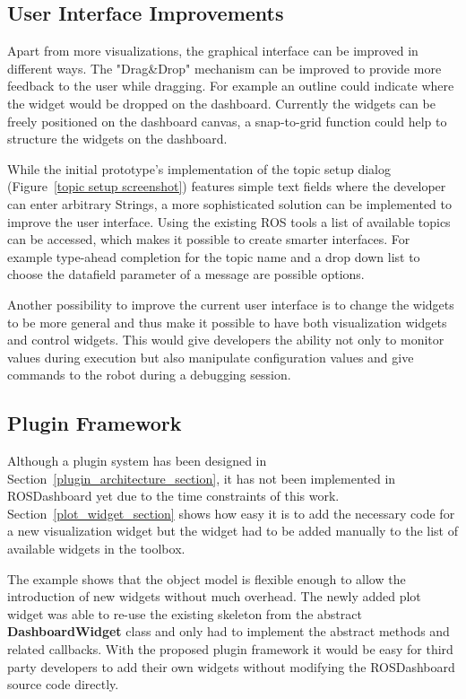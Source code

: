 \subsection{User Interface Improvements}
Apart from more visualizations, the graphical interface can be improved in different ways. The "Drag\&Drop" mechanism can be improved to provide more feedback to the user while dragging. For example an outline could indicate where the widget would be dropped on the dashboard. Currently the widgets can be freely positioned on the dashboard canvas, a snap-to-grid function could help to structure the widgets on the dashboard.

While the initial prototype's implementation of the topic setup dialog (Figure~\ref{topic setup screenshot}) features simple text fields where the developer can enter arbitrary Strings, a more sophisticated solution can be implemented to improve the user interface. Using the existing ROS tools a list of available topics can be accessed, which makes it possible to create smarter interfaces. For example type-ahead completion for the topic name and a drop down list to choose the datafield parameter of a message are possible options.

Another possibility to improve the current user interface is to change the widgets to be more general and thus make it possible to have both visualization widgets and control widgets. This would give developers the ability not only to monitor values during execution but also manipulate configuration values and give commands to the robot during a debugging session.

\subsection{Plugin Framework}
Although a plugin system has been designed in Section~\ref{plugin_architecture_section}, it has not been implemented in ROSDashboard yet due to the time constraints of this work. Section~\ref{plot_widget_section} shows how easy it is to add the necessary code for a new visualization widget but the widget had to be added manually to the list of available widgets in the toolbox.

The example shows that the object model is flexible enough to allow the introduction of new widgets without much overhead. The newly added plot widget was able to re-use the existing skeleton from the abstract \textbf{DashboardWidget} class and only had to implement the abstract methods and related callbacks. With the proposed plugin framework it would be easy for third party developers to add their own widgets without modifying the ROSDashboard source code directly.

